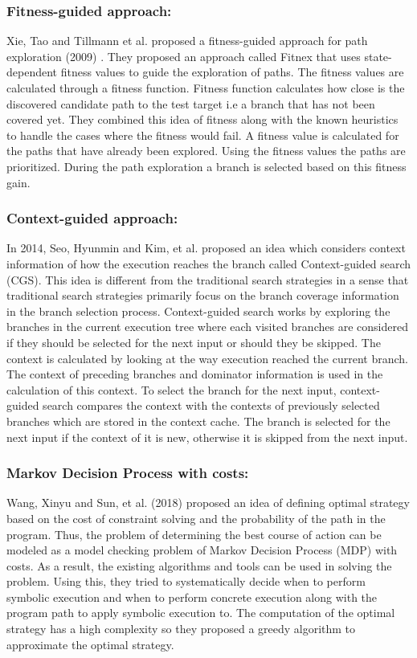 \documentclass[ runningheads,
               a4paper]{llncs}
\begin{document}
\subsubsection{Fitness-guided approach:}
Xie, Tao and Tillmann et al. proposed a fitness-guided approach for path exploration (2009) \cite{xie2009fitness}. They proposed an approach called Fitnex that uses state-dependent fitness values to guide the exploration of paths. The fitness values are calculated through a fitness function. Fitness function calculates how close is the discovered candidate path to the test target i.e a branch that has not been covered yet. They combined this idea of fitness along with the known heuristics to handle the cases where the fitness would fail. A fitness value is calculated for the paths that have already been explored. Using the fitness values the paths are prioritized. During the path exploration a branch is selected based on this fitness gain.


\subsubsection{Context-guided approach:}
In 2014, Seo, Hyunmin and Kim, et al. proposed an idea \cite{seo2014we} which considers context information of how the execution reaches the branch called Context-guided search (CGS). This idea is different from the traditional search strategies in a sense that traditional search strategies primarily focus on the branch coverage information in the branch selection process. Context-guided search works by exploring the branches in the current execution tree where each visited branches are considered if they should be selected for the next input or should they be skipped. The context is calculated by looking at the way execution reached the current branch. The context of preceding branches and dominator information is used in the calculation of this context. To select the branch for the next input, context-guided search compares the context with the contexts of previously selected branches which are stored in the context cache. The branch is selected for the next input if the context of it is new, otherwise it is skipped from the next input.


\subsubsection{Markov Decision Process with costs:}
Wang, Xinyu and Sun, et al. (2018) proposed an idea \cite{wang2018towards}  of defining optimal strategy based on the cost of constraint solving and the probability of the path in the program. Thus, the problem of determining the best course of action can be modeled as a model checking problem of Markov Decision Process (MDP) with costs. As a result, the existing algorithms and tools can be used in solving the problem. Using this, they tried to  systematically decide when to perform symbolic execution and when to perform concrete execution along with the program path to apply symbolic execution to.
The computation of the optimal strategy has a high complexity so they proposed a greedy algorithm to approximate the optimal strategy.
\end{document}
